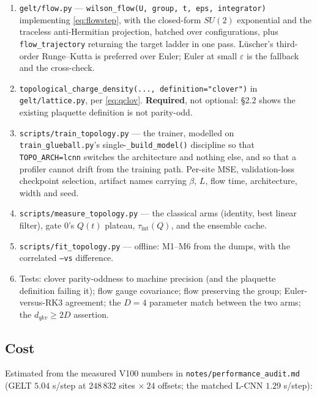 \documentclass[11pt,a4paper]{article}
\begin{document}
\begin{enumerate}
\item \texttt{gelt/flow.py} --- \texttt{wilson\_flow(U, group, t, eps,
  integrator)} implementing \eqref{eq:flowstep}, with the closed-form $SU(2)$
  exponential and the traceless anti-Hermitian projection, batched over
  configurations, plus \texttt{flow\_trajectory} returning the target ladder in
  one pass. L\"uscher's third-order Runge--Kutta is preferred over Euler; Euler
  at small $\varepsilon$ is the fallback and the cross-check.
\item \texttt{topological\_charge\_density(..., definition="clover")} in
  \texttt{gelt/lattice.py}, per \eqref{eq:qclov}. \textbf{Required}, not
  optional: \S2.2 shows the existing plaquette definition is not parity-odd.
\item \texttt{scripts/train\_topology.py} --- the trainer, modelled on
  \texttt{train\_glueball.py}'s single-\texttt{\_build\_model()} discipline so
  that \texttt{TOPO\_ARCH=lcnn} switches the architecture and nothing else, and
  so that a profiler cannot drift from the training path. Per-site MSE,
  validation-loss checkpoint selection, artifact names carrying $\beta$, $L$,
  flow time, architecture, width and seed.
\item \texttt{scripts/measure\_topology.py} --- the classical arms (identity,
  best linear filter), gate 0's $Q(t)$ plateau, $\tau_{\mathrm{int}}(Q)$, and the
  ensemble cache.
\item \texttt{scripts/fit\_topology.py} --- offline: M1--M6 from the dumps, with
  the correlated \texttt{--vs} difference.
\item Tests: clover parity-oddness to machine precision (and the plaquette
  definition failing it); flow gauge covariance; flow preserving the group;
  Euler-versus-RK3 agreement; the $D=4$ parameter match between the two arms;
  the $d_{qkv} \ge 2D$ assertion.
\end{enumerate}

\subsection{Cost}

Estimated from the measured V100 numbers in \texttt{notes/performance\_audit.md}
(GELT $5.04$ s/step at $248\,832$ sites $\times\ 24$ offsets; the matched L-CNN
$1.29$ s/step):
\end{document}
